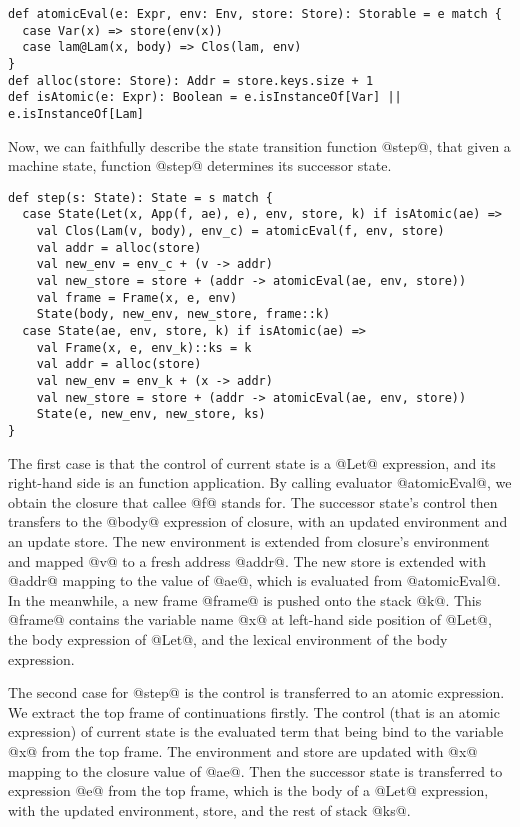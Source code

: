 \documentclass[acmsmall,review,anonymous]{acmart}\settopmatter{printfolios=true,printccs=false,printacmref=false}
\begin{document}
\begin{lstlisting}
def atomicEval(e: Expr, env: Env, store: Store): Storable = e match {
  case Var(x) => store(env(x))
  case lam@Lam(x, body) => Clos(lam, env)
}
def alloc(store: Store): Addr = store.keys.size + 1
def isAtomic(e: Expr): Boolean = e.isInstanceOf[Var] || e.isInstanceOf[Lam]
\end{lstlisting}

Now, we can faithfully describe the state transition function @step@,
that given a machine state, function @step@ determines its successor state.

\begin{lstlisting}
def step(s: State): State = s match {
  case State(Let(x, App(f, ae), e), env, store, k) if isAtomic(ae) =>
    val Clos(Lam(v, body), env_c) = atomicEval(f, env, store)
    val addr = alloc(store)
    val new_env = env_c + (v -> addr)
    val new_store = store + (addr -> atomicEval(ae, env, store))
    val frame = Frame(x, e, env)
    State(body, new_env, new_store, frame::k)
  case State(ae, env, store, k) if isAtomic(ae) =>
    val Frame(x, e, env_k)::ks = k
    val addr = alloc(store)
    val new_env = env_k + (x -> addr)
    val new_store = store + (addr -> atomicEval(ae, env, store))
    State(e, new_env, new_store, ks)
}
\end{lstlisting}

The first case is that the control of current state is a @Let@ expression,
and its right-hand side is an function application.
By calling evaluator @atomicEval@, we obtain the closure that callee @f@ stands for.
The successor state's control then transfers to the @body@ expression of closure,
with an updated environment and an update store. The new environment is extended
from closure's environment and mapped @v@ to a fresh address @addr@.
The new store is extended with @addr@ mapping to the value of @ae@,
which is evaluated from @atomicEval@.
In the meanwhile, a new frame @frame@ is pushed onto the stack @k@.
This @frame@ contains the variable name @x@ at left-hand side position of @Let@,
the body expression of @Let@, and the lexical environment of the body expression.

The second case for @step@ is the control is transferred to an atomic expression.
We extract the top frame of continuations firstly.
The control (that is an atomic expression) of current state is the evaluated term
that being bind to the variable @x@ from the top frame.
The environment and store are updated with @x@ mapping to the closure value of @ae@.
Then the successor state is transferred to expression @e@ from the top frame,
which is the body of a @Let@ expression, with the updated environment, store, and
the rest of stack @ks@.
\end{document}
